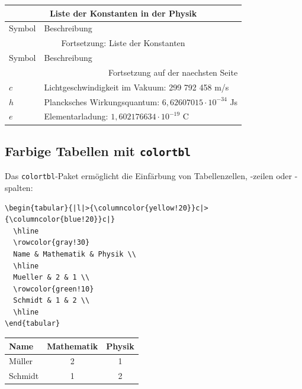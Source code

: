 \documentclass[12pt,a4paper]{article}
\begin{document}
\begin{ausgabe}
	\begin{longtable}{|l|p{10cm}|}
  \hline
  \multicolumn{2}{|c|}{Liste der Konstanten in der Physik} \\
  \hline
  Symbol & Beschreibung \\
  \hline
  \endfirsthead
  
  \hline
  \multicolumn{2}{|c|}{Fortsetzung: Liste der Konstanten} \\
  \hline
  Symbol & Beschreibung \\
  \hline
  \endhead
  
  \hline
  \multicolumn{2}{|r|}{Fortsetzung auf der naechsten Seite} \\
  \hline
  \endfoot
  
  \hline
  \endlastfoot
  
  $c$ & Lichtgeschwindigkeit im Vakuum: 299 792 458 m/s \\
  \hline
  $h$ & Plancksches Wirkungsquantum: $6,626 070 15 \cdot 10^{-34}$ Js \\
  \hline
  $e$ & Elementarladung: $1,602 176 634 \cdot 10^{-19}$ C \\
  \hline
\end{longtable}
\end{ausgabe}

\subsection{Farbige Tabellen mit \texttt{colortbl}}

Das \texttt{colortbl}-Paket ermöglicht die Einfärbung von Tabellenzellen, -zeilen oder -spalten:

\begin{lstlisting}[style=latex]
\begin{tabular}{|l|>{\columncolor{yellow!20}}c|>{\columncolor{blue!20}}c|}
  \hline
  \rowcolor{gray!30}
  Name & Mathematik & Physik \\
  \hline
  Mueller & 2 & 1 \\
  \rowcolor{green!10}
  Schmidt & 1 & 2 \\
  \hline
\end{tabular}
\end{lstlisting}

\begin{ausgabe}
\begin{center}
\begin{tabular}{|l|>{\columncolor{yellow!20}}c|>{\columncolor{blue!20}}c|}
  \hline
  \rowcolor{gray!30}
  Name & Mathematik & Physik \\
  \hline
  Müller & 2 & 1 \\
  \rowcolor{green!10}
  Schmidt & 1 & 2 \\
  \hline
\end{tabular}
\end{center}
\end{ausgabe}
\end{document}
